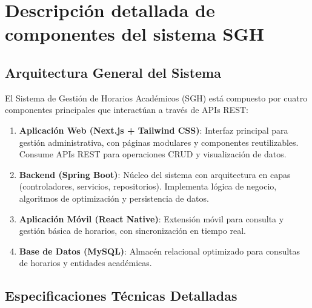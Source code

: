 \appendix

\section{Descripción detallada de componentes del sistema SGH}

\subsection{Arquitectura General del Sistema}

El Sistema de Gestión de Horarios Académicos (SGH) está compuesto por cuatro componentes principales que interactúan a través de APIs REST:

\begin{enumerate}
\item \textbf{Aplicación Web (Next.js + Tailwind CSS)}: Interfaz principal para gestión administrativa, con páginas modulares y componentes reutilizables. Consume APIs REST para operaciones CRUD y visualización de datos.
\item \textbf{Backend (Spring Boot)}: Núcleo del sistema con arquitectura en capas (controladores, servicios, repositorios). Implementa lógica de negocio, algoritmos de optimización y persistencia de datos.
\item \textbf{Aplicación Móvil (React Native)}: Extensión móvil para consulta y gestión básica de horarios, con sincronización en tiempo real.
\item \textbf{Base de Datos (MySQL)}: Almacén relacional optimizado para consultas de horarios y entidades académicas.
\end{enumerate}

\subsection{Especificaciones Técnicas Detalladas}

